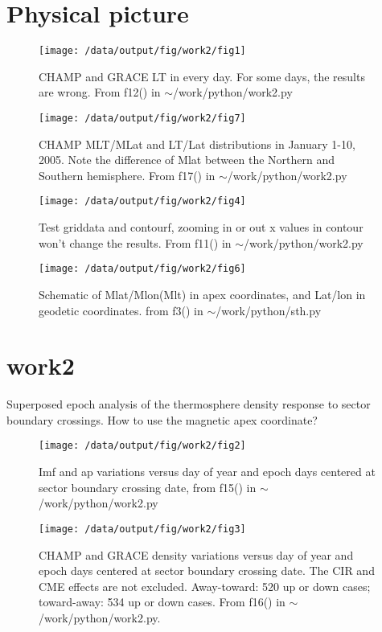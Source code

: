 \documentclass[12pt,a4paper]{article}
\begin{document}
\section{Physical picture}
\begin{figure}[!ht]
    \centering
    \texttt{[image: /data/output/fig/work2/fig1]}
    \label{fig1}
    \caption{CHAMP and GRACE LT in every day. For some days, the results are wrong. From f12() in $\sim$/work/python/work2.py}
\end{figure}

\begin{figure}[!ht]
    \centering
    \texttt{[image: /data/output/fig/work2/fig7]}
    \label{fig2}
    \caption{ CHAMP MLT/MLat and LT/Lat distributions in January 1-10, 2005. Note the difference of Mlat between the Northern and Southern hemisphere. From f17() in $\sim$/work/python/work2.py}
\end{figure}

\begin{figure}[!ht]
    \centering
    \texttt{[image: /data/output/fig/work2/fig4]}
    \label{fig3}
    \caption{Test griddata and contourf, zooming in or out x values in contour won't change the results. From f11() in $\sim$/work/python/work2.py}
\end{figure}

\begin{figure}[!ht]
    \centering
    \texttt{[image: /data/output/fig/work2/fig6]}
    \label{fig4}
    \caption{Schematic of Mlat/Mlon(Mlt) in apex coordinates, and Lat/lon in geodetic coordinates. from f3() in $\sim$/work/python/sth.py}
\end{figure}
\newpage

\section{work2}
Superposed epoch analysis of the thermosphere density response to sector boundary crossings.
How to use the magnetic apex coordinate?
\begin{figure}[!ht]
    \centering
    \texttt{[image: /data/output/fig/work2/fig2]}
    \label{fig5}
    \caption{Imf and ap variations versus day of year and epoch days centered at sector boundary crossing date, from f15() in $\sim$/work/python/work2.py}
\end{figure}

\begin{figure}[!ht]
    \centering
    \texttt{[image: /data/output/fig/work2/fig3]}
    \label{fig6}
    \caption{CHAMP and GRACE density variations versus day of year and epoch days centered at sector boundary crossing date. The CIR and CME effects are not excluded. Away-toward: 520 up or down cases; toward-away: 534 up or down cases. From f16() in $\sim$/work/python/work2.py. }
\end{figure}
\end{document}
